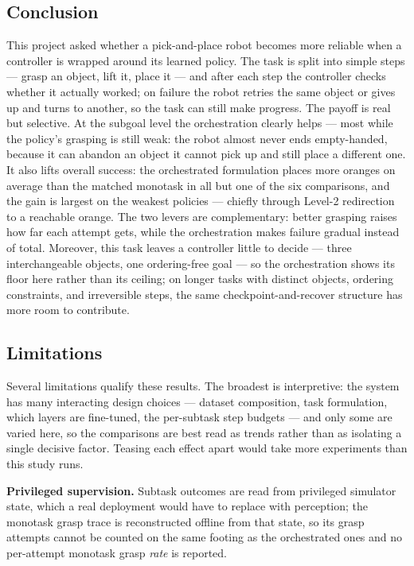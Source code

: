 \subsection{Conclusion}

This project asked whether a pick-and-place robot becomes more reliable when a controller is wrapped around its learned policy. The task is split into simple steps --- grasp an object, lift it, place it --- and after each step the controller checks whether it actually worked; on failure the robot retries the same object or gives up and turns to another, so the task can still make progress. The payoff is real but selective. At the subgoal level the orchestration clearly helps --- most while the policy's grasping is still weak: the robot almost never ends empty-handed, because it can abandon an object it cannot pick up and still place a different one. It also lifts overall success: the orchestrated formulation places more oranges on average than the matched monotask in all but one of the six comparisons, and the gain is largest on the weakest policies --- chiefly through Level-2 redirection to a reachable orange. The two levers are complementary: better grasping raises how far each attempt gets, while the orchestration makes failure gradual instead of total. Moreover, this task leaves a controller little to decide --- three interchangeable objects, one ordering-free goal --- so the orchestration shows its floor here rather than its ceiling; on longer tasks with distinct objects, ordering constraints, and irreversible steps, the same checkpoint-and-recover structure has more room to contribute.

\subsection{Limitations}
\label{subsec:limitations}

Several limitations qualify these results. The broadest is interpretive: the system has many interacting design choices --- dataset composition, task formulation, which layers are fine-tuned, the per-subtask step budgets --- and only some are varied here, so the comparisons are best read as trends rather than as isolating a single decisive factor. Teasing each effect apart would take more experiments than this study runs.

\textbf{Privileged supervision.} Subtask outcomes are read from privileged simulator state, which a real deployment would have to replace with perception; the monotask grasp trace is reconstructed offline from that state, so its grasp attempts cannot be counted on the same footing as the orchestrated ones and no per-attempt monotask grasp \emph{rate} is reported.


